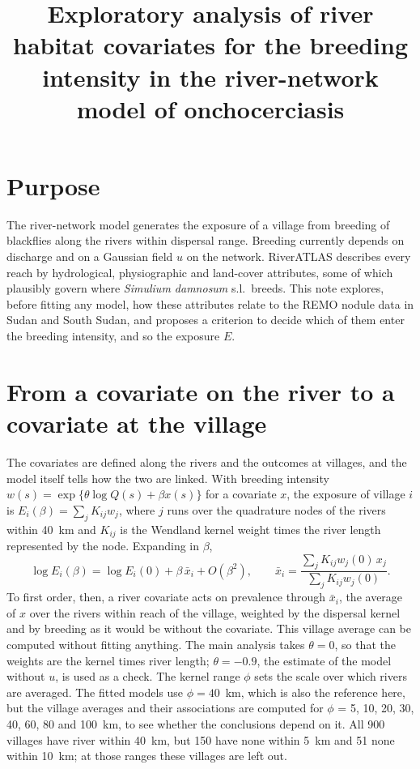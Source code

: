 \documentclass[11pt,a4paper]{article}
\title{Exploratory analysis of river habitat covariates for the breeding intensity in the river-network model of onchocerciasis}
\author{}
\date{}
\begin{document}
\maketitle

\section{Purpose}

The river-network model generates the exposure of a village from breeding of blackflies along the rivers within dispersal range. Breeding currently depends on discharge and on a Gaussian field $u$ on the network. RiverATLAS \citep{linke2019} describes every reach by hydrological, physiographic and land-cover attributes, some of which plausibly govern where \textit{Simulium damnosum} s.l.\ breeds. This note explores, before fitting any model, how these attributes relate to the REMO nodule data in Sudan and South Sudan, and proposes a criterion to decide which of them enter the breeding intensity, and so the exposure $E$.

\section{From a covariate on the river to a covariate at the village}

The covariates are defined along the rivers and the outcomes at villages, and the model itself tells how the two are linked. With breeding intensity $w(s) = \exp\{\theta \log Q(s) + \beta x(s)\}$ for a covariate $x$, the exposure of village $i$ is $E_i(\beta) = \sum_j K_{ij} w_j$, where $j$ runs over the quadrature nodes of the rivers within 40~km and $K_{ij}$ is the Wendland kernel weight times the river length represented by the node. Expanding in $\beta$,
\[
\log E_i(\beta) = \log E_i(0) + \beta\, \bar{x}_i + O(\beta^2), \qquad
\bar{x}_i = \frac{\sum_j K_{ij} w_j(0)\, x_j}{\sum_j K_{ij} w_j(0)} .
\]
To first order, then, a river covariate acts on prevalence through $\bar x_i$, the average of $x$ over the rivers within reach of the village, weighted by the dispersal kernel and by breeding as it would be without the covariate. This village average can be computed without fitting anything. The main analysis takes $\theta = 0$, so that the weights are the kernel times river length; $\theta = -0.9$, the estimate of the model without $u$, is used as a check. The kernel range $\phi$ sets the scale over which rivers are averaged. The fitted models use $\phi = 40$~km, which is also the reference here, but the village averages and their associations are computed for $\phi$ = 5, 10, 20, 30, 40, 60, 80 and 100~km, to see whether the conclusions depend on it. All 900 villages have river within 40~km, but 150 have none within 5~km and 51 none within 10~km; at those ranges these villages are left out.
\end{document}
